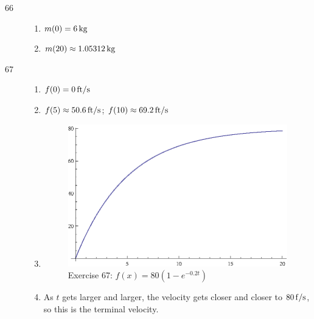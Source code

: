 \documentclass{exam}
\begin{document}
\begin{description}

      \item[66]
        \begin{enumerate}[a]
          \item $m(0) = \unit[6]{kg}$
          \item $m(20) \approx \unit[1.05312]{kg}$
        \end{enumerate}

      \item[67]
        \begin{enumerate}[a]
          \item $f(0) = \unit[0]{ft/s}$

          \item $f(5) \approx \unit[50.6]{ft/s}$; $f(10) \approx \unit[69.2]{ft/s}$

          \item
            \begin{figure}[H]
              \centering
              \includegraphics[scale=0.9]{exercise67.eps}
              \caption*{Exercise 67: $f(x) = 80 \left( 1 - e^{-0.2t} \right)$}
            \end{figure}

          \item As $t$ gets larger and larger, the velocity gets closer and closer to $\unit[80]{f/s}$, so this is the
            terminal velocity.


\end{enumerate}
\end{description}
\end{document}
